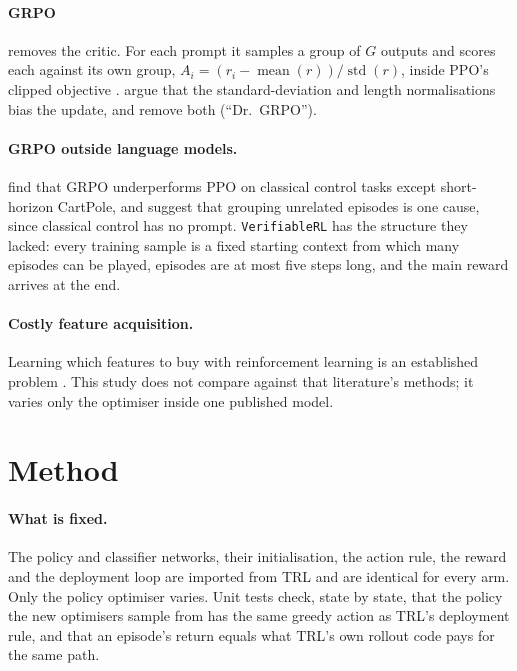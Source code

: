 \documentclass[11pt,a4paper]{article}
\begin{document}
\paragraph{GRPO} removes the critic. For each prompt it samples a group of $G$ outputs and scores each against
its own group, $A_i = (r_i - \operatorname{mean}(r)) / \operatorname{std}(r)$, inside PPO's clipped objective
\citep{shao2024deepseekmath}. \citet{liu2025drgrpo} argue that the standard-deviation and length normalisations
bias the update, and remove both (``Dr.\ GRPO'').

\paragraph{GRPO outside language models.} \citet{deoliveira2025grpo} find that GRPO underperforms PPO on
classical control tasks except short-horizon CartPole, and suggest that grouping unrelated episodes is one cause,
since classical control has no prompt. \texttt{VerifiableRL} has the structure they lacked: every training
sample is a fixed starting context from which many episodes can be played, episodes are at most five steps long,
and the main reward arrives at the end.

\paragraph{Costly feature acquisition.} Learning which features to buy with reinforcement learning is an
established problem \citep{janisch2019costly}. This study does not compare against that literature's methods; it
varies only the optimiser inside one published model.

\section{Method}

\paragraph{What is fixed.} The policy and classifier networks, their initialisation, the action rule, the reward
and the deployment loop are imported from TRL and are identical for every arm. Only the policy optimiser varies.
Unit tests check, state by state, that the policy the new optimisers sample from has the same greedy action as
TRL's deployment rule, and that an episode's return equals what TRL's own rollout code pays for the same path.
\end{document}
